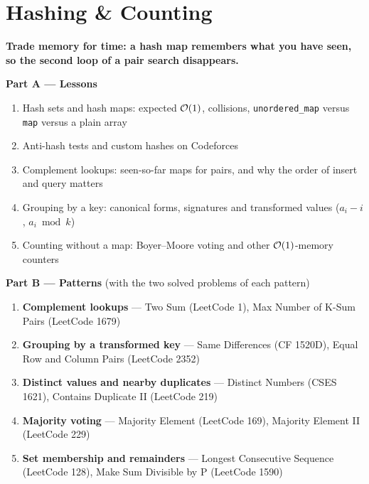 \chapter{Hashing \& Counting}
\label{ch:hashing}

\begin{tcolorbox}[enhanced, colback=white, colframe=secondaryblue, boxrule=1pt, arc=2mm]
\textbf{\large\textcolor{primaryblue}{Trade memory for time: a hash map remembers what you have seen, so the second loop of a pair search disappears.}}
\end{tcolorbox}


\begin{plannedbox}
\textbf{Part A --- Lessons}
\begin{enumerate}[leftmargin=*, label=\textbf{A\arabic*.}, itemsep=1pt]
    \item Hash sets and hash maps: expected $\mathcal{O}(1)$, collisions, \texttt{unordered\_map} versus \texttt{map} versus a plain array
    \item Anti-hash tests and custom hashes on Codeforces
    \item Complement lookups: seen-so-far maps for pairs, and why the order of insert and query matters
    \item Grouping by a key: canonical forms, signatures and transformed values ($a_i - i$, $a_i \bmod k$)
    \item Counting without a map: Boyer--Moore voting and other $\mathcal{O}(1)$-memory counters
\end{enumerate}
\textbf{Part B --- Patterns} (with the two solved problems of each pattern)
\begin{enumerate}[leftmargin=*, label=\textbf{P\arabic*.}, itemsep=1pt]
    \item \textbf{Complement lookups} --- Two Sum {\small\color{darkgray}(LeetCode 1)}, Max Number of K-Sum Pairs {\small\color{darkgray}(LeetCode 1679)}
    \item \textbf{Grouping by a transformed key} --- Same Differences {\small\color{darkgray}(CF 1520D)}, Equal Row and Column Pairs {\small\color{darkgray}(LeetCode 2352)}
    \item \textbf{Distinct values and nearby duplicates} --- Distinct Numbers {\small\color{darkgray}(CSES 1621)}, Contains Duplicate II {\small\color{darkgray}(LeetCode 219)}
    \item \textbf{Majority voting} --- Majority Element {\small\color{darkgray}(LeetCode 169)}, Majority Element II {\small\color{darkgray}(LeetCode 229)}
    \item \textbf{Set membership and remainders} --- Longest Consecutive Sequence {\small\color{darkgray}(LeetCode 128)}, Make Sum Divisible by P {\small\color{darkgray}(LeetCode 1590)}
\end{enumerate}
\end{plannedbox}
